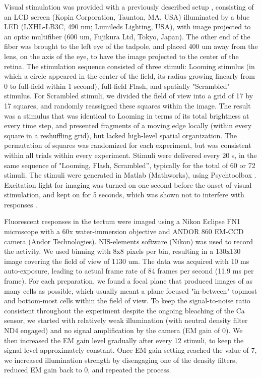 \documentclass{article}
\begin{document}
Visual stimulation was provided with a previously described setup \citep{khakhalin2014}, consisting of an LCD screen (Kopin Corporation, Taunton, MA, USA) illuminated by a blue LED (LXHL-LB3C, 490 nm; Lumileds Lighting, USA), with image projected to an optic multifiber (600 um, Fujikura Ltd, Tokyo, Japan). The other end of the fiber was brought to the left eye of the tadpole, and placed 400 um away from the lens, on the axis of the eye, to have the image projected to the center of the retina. The stimulation sequence consisted of three stimuli: Looming stimulus (in which a circle appeared in the center of the field, its radius growing linearly from 0 to full-field within 1 second), full-field Flash, and spatially "Scrambled" stimulus. For Scrambled stimuli, we divided the field of view into a grid of 17 by 17 squares, and randomly reassigned these squares within the image. The result was a stimulus that was identical to Looming in terms of its total brightness at every time step, and presented fragments of a moving edge locally (within every square in a reshuffling grid), but lacked high-level spatial organization. The permutation of squares was randomized for each experiment, but was consistent within all trials within every experiment. Stimuli were delivered every 20 s, in the same sequence of "Looming, Flash, Scrambled”, typically for the total of 60 or 72 stimuli. The stimuli were generated in Matlab (Mathworks), using Psychtoolbox \citep{kleiner2007psychtoolbox}. Excitation light for imaging was turned on one second before the onset of visual stimulation, and kept on for 5 seconds, which was shown not to interfere with responses \citep{xu2011}.

Fluorescent responses in the tectum were imaged using a Nikon Eclipse FN1 microscope with a 60x water-immersion objective and ANDOR 860 EM-CCD camera (Andor Technologies). NIS-elements software (Nikon) was used to record the activity. We used binning with 8x8 pixels per bin, resulting in a 130x130 image covering the field of view of 1130 um. The data was acquired with 10 ms auto-exposure, leading to actual frame rate of 84 frames per second (11.9 ms per frame). For each preparation, we found a focal plane that produced images of as many cells as possible, which usually meant a plane focused "in-between" topmost and bottom-most cells within the field of view. To keep the signal-to-noise ratio consistent throughout the experiment despite the ongoing bleaching of the Ca sensor, we started with relatively weak illumination (with neutral density filter ND4 engaged) and no signal amplification by the camera (EM gain of 0). We then increased the EM gain level gradually after every 12 stimuli, to keep the signal level approximately constant. Once EM gain setting reached the value of 7, we increased illumination strength by disengaging one of the density filters, reduced EM gain back to 0, and repeated the process.
\end{document}
